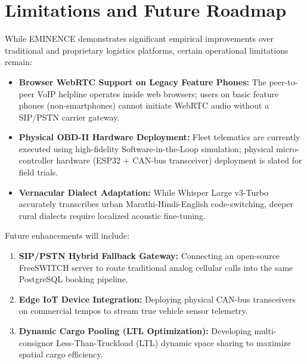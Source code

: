 \documentclass[conference]{IEEEtran}
\begin{document}
\section{Limitations and Future Roadmap}
While EMINENCE demonstrates significant empirical improvements over traditional and proprietary logistics platforms, certain operational limitations remain:
\begin{itemize}
    \item \textbf{Browser WebRTC Support on Legacy Feature Phones:} The peer-to-peer VoIP helpline operates inside web browsers; users on basic feature phones (non-smartphones) cannot initiate WebRTC audio without a SIP/PSTN carrier gateway.
    \item \textbf{Physical OBD-II Hardware Deployment:} Fleet telematics are currently executed using high-fidelity Software-in-the-Loop simulation; physical micro-controller hardware (ESP32 + CAN-bus transceiver) deployment is slated for field trials.
    \item \textbf{Vernacular Dialect Adaptation:} While Whisper Large v3-Turbo accurately transcribes urban Marathi-Hindi-English code-switching, deeper rural dialects require localized acoustic fine-tuning.
\end{itemize}

Future enhancements will include:
\begin{enumerate}
    \item \textbf{SIP/PSTN Hybrid Fallback Gateway:} Connecting an open-source FreeSWITCH server to route traditional analog cellular calls into the same PostgreSQL booking pipeline.
    \item \textbf{Edge IoT Device Integration:} Deploying physical CAN-bus transceivers on commercial tempos to stream true vehicle sensor telemetry.
    \item \textbf{Dynamic Cargo Pooling (LTL Optimization):} Developing multi-consignor Less-Than-Truckload (LTL) dynamic space sharing to maximize spatial cargo efficiency.
\end{enumerate}
\end{document}
